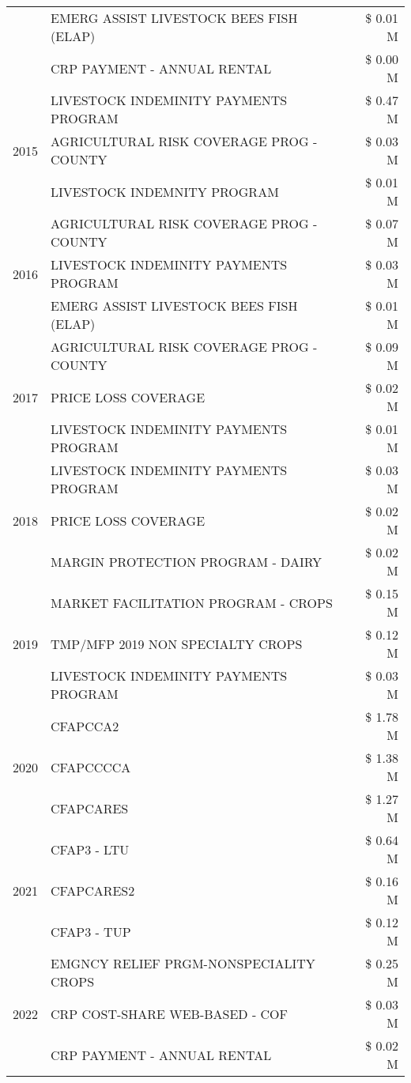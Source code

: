 \begin{tabular}{llr}
 & EMERG ASSIST LIVESTOCK BEES FISH (ELAP) & \$ 0.01 M \\
 & CRP PAYMENT - ANNUAL RENTAL & \$ 0.00 M \\
\cline{1-3}
\multirow[t]{3}{*}{2015} & LIVESTOCK INDEMINITY PAYMENTS PROGRAM & \$ 0.47 M \\
 & AGRICULTURAL RISK COVERAGE PROG - COUNTY & \$ 0.03 M \\
 & LIVESTOCK INDEMNITY PROGRAM & \$ 0.01 M \\
\cline{1-3}
\multirow[t]{3}{*}{2016} & AGRICULTURAL RISK COVERAGE PROG - COUNTY & \$ 0.07 M \\
 & LIVESTOCK INDEMINITY PAYMENTS PROGRAM & \$ 0.03 M \\
 & EMERG ASSIST LIVESTOCK BEES FISH (ELAP) & \$ 0.01 M \\
\cline{1-3}
\multirow[t]{3}{*}{2017} & AGRICULTURAL RISK COVERAGE PROG - COUNTY & \$ 0.09 M \\
 & PRICE LOSS COVERAGE & \$ 0.02 M \\
 & LIVESTOCK INDEMINITY PAYMENTS PROGRAM & \$ 0.01 M \\
\cline{1-3}
\multirow[t]{3}{*}{2018} & LIVESTOCK INDEMINITY PAYMENTS PROGRAM & \$ 0.03 M \\
 & PRICE LOSS COVERAGE & \$ 0.02 M \\
 & MARGIN PROTECTION PROGRAM - DAIRY & \$ 0.02 M \\
\cline{1-3}
\multirow[t]{3}{*}{2019} & MARKET FACILITATION PROGRAM - CROPS & \$ 0.15 M \\
 & TMP/MFP 2019 NON SPECIALTY CROPS & \$ 0.12 M \\
 & LIVESTOCK INDEMINITY PAYMENTS PROGRAM & \$ 0.03 M \\
\cline{1-3}
\multirow[t]{3}{*}{2020} & CFAPCCA2 & \$ 1.78 M \\
 & CFAPCCCCA & \$ 1.38 M \\
 & CFAPCARES & \$ 1.27 M \\
\cline{1-3}
\multirow[t]{3}{*}{2021} & CFAP3 - LTU & \$ 0.64 M \\
 & CFAPCARES2 & \$ 0.16 M \\
 & CFAP3 - TUP & \$ 0.12 M \\
\cline{1-3}
\multirow[t]{3}{*}{2022} & EMGNCY RELIEF PRGM-NONSPECIALITY CROPS & \$ 0.25 M \\
 & CRP COST-SHARE WEB-BASED - COF & \$ 0.03 M \\
 & CRP PAYMENT - ANNUAL RENTAL & \$ 0.02 M \\
\cline{1-3}
\bottomrule
\end{tabular}
